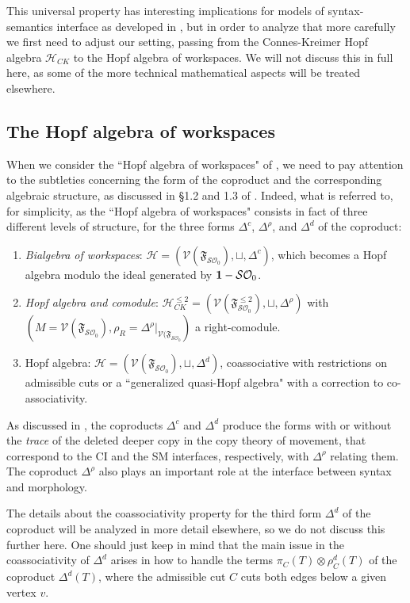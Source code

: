 \documentclass[12pt]{amsart}
\numberwithin{equation}{section}
\def\cH{{\mathcal H}}
\def\cO{{\mathcal O}}
\def\cS{{\mathcal S}}
\def\cV{{\mathcal V}}
\def\fF{{\mathfrak F}}
\begin{document}
\smallskip

This universal property has interesting implications for models of syntax-semantics interface as
developed in \cite{MCB}, but in order to analyze that more carefully we first need to adjust
our setting, passing from the Connes-Kreimer Hopf algebra $\cH_{CK}$ to the Hopf algebra
of workspaces. We will not discuss this in full here, as some of the more technical mathematical 
aspects will be treated elsewhere. 


\smallskip
\subsection{The Hopf algebra of workspaces}\label{HopfWorkSec}

When we consider the ``Hopf algebra of workspaces" of \cite{MCB}, we need to pay attention to the
subtleties concerning the form of the coproduct and the corresponding algebraic
structure, as discussed in \S 1.2 and 1.3 of \cite{MCB}. Indeed, what is referred to, for
simplicity, as the ``Hopf algebra of workspaces" consists in fact of three different levels of
structure, for the three forms $\Delta^c$, $\Delta^\rho$, and $\Delta^d$ of the coproduct:
\begin{enumerate}
\item {\em Bialgebra of workspaces}: $\cH=(\cV(\fF_{\cS\cO_0}), \sqcup, \Delta^c)$, which becomes a
Hopf algebra modulo the ideal generated by ${\bf 1}-\cS\cO_0$.
\item {\em Hopf algebra and comodule}: $\cH_{CK}^{\leq 2}=(\cV(\fF^{\leq 2}_{\cS\cO_0}), \sqcup, \Delta^\rho)$
with $(M=\cV(\fF_{\cS\cO_0}), \rho_R=\Delta^\rho|_{\cV(\fF_{\cS\cO_0}})$ a right-comodule.
\item Hopf algebra: $\cH=(\cV(\fF_{\cS\cO_0}), \sqcup, \Delta^d)$, coassociative with restrictions on
admissible cuts or a ``generalized quasi-Hopf algebra" with a correction to
co-associativity.
\end{enumerate}
As discussed in \cite{MCB}, the coproducts $\Delta^c$ and $\Delta^d$ produce the forms with
or without the {\em trace} of the deleted deeper copy in the copy theory of movement, that
correspond to the CI and the SM interfaces, respectively, with $\Delta^\rho$ relating them. 
The coproduct $\Delta^\rho$ also plays an important role at the interface between syntax
and morphology. 

The details about the coassociativity property for the third form $\Delta^d$ of the coproduct 
will be analyzed in more detail elsewhere, so we do not discuss this further here. One should
just keep in mind that the main issue in the coassociativity of $\Delta^d$ arises in how to
handle the terms $\pi_C(T) \otimes \rho^d_C(T)$ of the coproduct $\Delta^d(T)$, where
the admissible cut $C$ cuts both edges below a given vertex $v$. 
\end{document}
